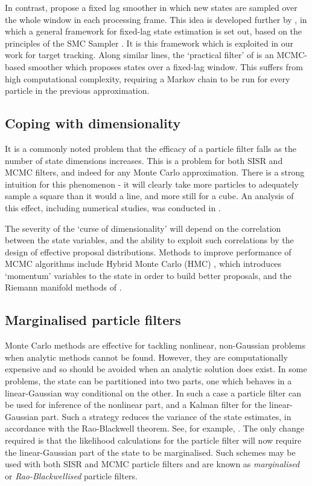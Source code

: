 In contrast, \cite{Pitt2001} propose a fixed lag smoother in which new states are sampled over the whole window in each processing frame. This idea is developed further by \cite{Doucet2006}, in which a general framework for fixed-lag state estimation is set out, based on the principles of the SMC Sampler \cite{DelMoral2006}. It is this framework which is exploited in our work for target tracking. Along similar lines, the `practical filter' of \cite{Polson2008} is an MCMC-based smoother which proposes states over a fixed-lag window. This suffers from high computational complexity, requiring a Markov chain to be run for every particle in the previous approximation.



\subsection{Coping with dimensionality}
It is a commonly noted problem that the efficacy of a particle filter falls as the number of state dimensions increases. This is a problem for both SISR and MCMC filters, and indeed for any Monte Carlo approximation. There is a strong intuition for this phenomenon - it will clearly take more particles to adequately sample a square than it would a line, and more still for a cube. An analysis of this effect, including numerical studies, was conducted in \cite{Daum2003}.

The severity of the `curse of dimensionality' will depend on the correlation between the state variables, and the ability to exploit such correlations by the design of effective proposal distributions. Methods to improve performance of MCMC algorithms include Hybrid Monte Carlo (HMC) \cite{Duane1987}, which introduces `momentum' variables to the state in order to build better proposals, and the Riemann manifold methods of \cite{Girolami2011}.



\subsection{Marginalised particle filters}
Monte Carlo methods are effective for tackling nonlinear, non-Gaussian problems when analytic methods cannot be found. However, they are computationally expensive and so should be avoided when an analytic solution does exist. In some problems, the state can be partitioned into two parts, one which behaves in a linear-Gaussian way conditional on the other. In such a case a particle filter can be used for inference of the nonlinear part, and a Kalman filter for the linear-Gaussian part. Such a strategy reduces the variance of the state estimates, in accordance with the Rao-Blackwell theorem. See, for example, \cite{Casella1996}. The only change required is that the likelihood calculations for the particle filter will now require the linear-Gaussian part of the state to be marginalised. Such schemes may be used with both SISR and MCMC particle filters and are known as \emph{marginalised} or \emph{Rao-Blackwellised} particle filters.
